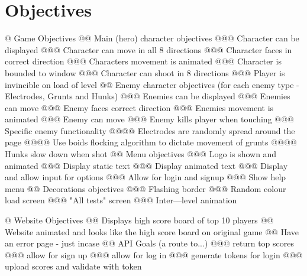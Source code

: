 \section{Objectives}
\begin{easylist}[articletoc]
@ Game Objectives
@@ Main (hero) character objectives
@@@ Character can be displayed
@@@ Character can move in all 8 directions
@@@ Character faces in correct direction
@@@ Characters movement is animated
@@@ Character is bounded to window
@@@ Character can shoot in 8 directions
@@@ Player is invincible on load of level
@@ Enemy character objectives (for each enemy type - Electrodes, Grunts and Hunks)
@@@ Enemies can be displayed
@@@ Enemies can move
@@@ Enemy faces correct direction
@@@ Enemies movement is animated
@@@ Enemy can move
@@@ Enemy kills player when touching
@@@ Specific enemy functionality
@@@@ Electrodes are randomly spread around the page
@@@@ Use boids flocking algorithm to dictate movement of grunts
@@@@ Hunks slow down when shot
@@ Menu objectives
@@@ Logo is shown and animated
@@@ Display static text
@@@ Display animated text
@@@ Display and allow input for options
@@@ Allow for login and signup
@@@ Show help menu
@@ Decorations objectives
@@@ Flashing border
@@@ Random colour load screen
@@@ "All tests" screen
@@@ Inter---level animation

@ Website Objectives
@@ Displays high score board of top 10 players
@@ Website animated and looks like the high score board on original game
@@ Have an error page - just incase
@@ API Goals (a route to...)
@@@ return top scores
@@@ allow for sign up
@@@ allow for log in
@@@ generate tokens for login
@@@ upload scores and validate with token

\end{easylist}